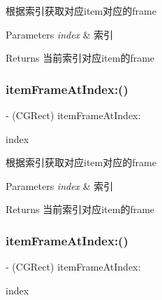根据索引获取对应item对应的frame


\begin{DoxyParams}{Parameters}
{\em index} & 索引\\
\hline
\end{DoxyParams}
\begin{DoxyReturn}{Returns}
当前索引对应item的frame 
\end{DoxyReturn}
\mbox{\label{interface_v_t_menu_bar_ab9b968d5635a07a921bea02b7ea019c3}} 
\subsubsection{\texorpdfstring{item\+Frame\+At\+Index\+:()}{itemFrameAtIndex:()}\hspace{0.1cm}{\footnotesize\ttfamily [2/3]}}
{\footnotesize\ttfamily -\/ (C\+G\+Rect) item\+Frame\+At\+Index\+: \begin{DoxyParamCaption}\item[{(N\+S\+U\+Integer)}]{index }\end{DoxyParamCaption}}

根据索引获取对应item对应的frame


\begin{DoxyParams}{Parameters}
{\em index} & 索引\\
\hline
\end{DoxyParams}
\begin{DoxyReturn}{Returns}
当前索引对应item的frame 
\end{DoxyReturn}
\mbox{\label{interface_v_t_menu_bar_ab9b968d5635a07a921bea02b7ea019c3}} 
\subsubsection{\texorpdfstring{item\+Frame\+At\+Index\+:()}{itemFrameAtIndex:()}\hspace{0.1cm}{\footnotesize\ttfamily [3/3]}}
{\footnotesize\ttfamily -\/ (C\+G\+Rect) item\+Frame\+At\+Index\+: \begin{DoxyParamCaption}\item[{(N\+S\+U\+Integer)}]{index }\end{DoxyParamCaption}}

